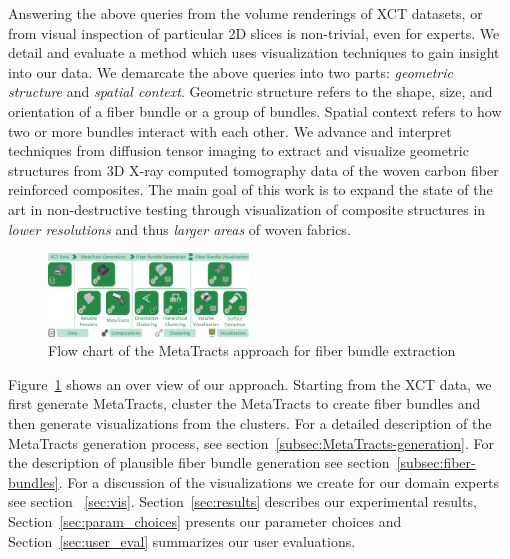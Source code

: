 Answering the above queries from the volume renderings of XCT datasets, or from visual inspection of particular 2D slices is non-trivial, even for experts. We detail and evaluate a method which uses visualization techniques to gain insight into our data. We demarcate the above queries into two parts: \textit{geometric structure} and \textit{spatial context}. Geometric structure refers to the shape, size, and orientation of a fiber bundle or a group of bundles. Spatial context refers to how two or more bundles interact with each other. 
We advance and interpret techniques from diffusion tensor imaging to extract and visualize geometric structures from 3D X-ray computed tomography data of the woven carbon fiber reinforced composites. The main goal of this work is to expand the state of the art in non-destructive testing through visualization of composite structures in \textit{lower resolutions} and thus \textit{larger areas} of woven fabrics.
\begin{figure}[tb]
	\centering
	\includegraphics[width=0.475\textwidth]{images_pvis/workflow.pdf}
	\caption{Flow chart of the MetaTracts approach for fiber bundle extraction}
	\label{fig:flowchart}
\end{figure}
Figure~\ref{fig:flowchart} shows an over view of our approach. Starting from the XCT data, we first generate MetaTracts, cluster the MetaTracts to create fiber bundles and then generate visualizations from the clusters. For a detailed description of the MetaTracts generation process, see section~\ref{subsec:MetaTracts-generation}. For the description of plausible fiber bundle generation see section~\ref{subsec:fiber-bundles}. For a discussion of the visualizations we create for our domain experts see section ~\ref{sec:vis}. Section~\ref{sec:results} describes our experimental results, Section~\ref{sec:param_choices} presents our parameter choices and  Section~\ref{sec:user_eval} summarizes our user evaluations.



